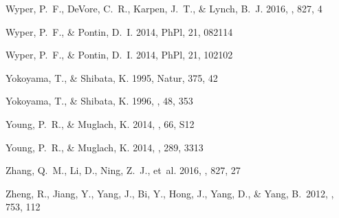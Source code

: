 \documentclass[twocolumn]{aastex6}
\newcommand{\phpl}{PhPl}
\begin{document}
\begin{thebibliography}{}
{Wyper}, P.~F., {DeVore}, C.~R., {Karpen}, J.~T., \& {Lynch}, B.~J. 2016, \apj,
  827, 4

{Wyper}, P.~F., \& {Pontin}, D.~I. 2014{}, \phpl, 21, 082114

{Wyper}, P.~F., \& {Pontin}, D.~I. 2014{}, \phpl, 21, 102102

{Yokoyama}, T., \& {Shibata}, K. 1995, Natur, 375, 42

{Yokoyama}, T., \& {Shibata}, K. 1996, \pasj, 48, 353

{Young}, P.~R., \& {Muglach}, K. 2014{}, \pasj, 66, S12

{Young}, P.~R., \& {Muglach}, K. 2014{}, \solphys, 289, 3313

{Zhang}, Q.~M., {Li}, D., {Ning}, Z.~J., {et~al.} 2016, \apj, 827, 27

{Zheng}, R., {Jiang}, Y., {Yang}, J., {Bi}, Y., {Hong}, J., {Yang}, D., \& {Yang}, B.\ 2012, \apj, 753, 112

\end{thebibliography}
\end{document}
